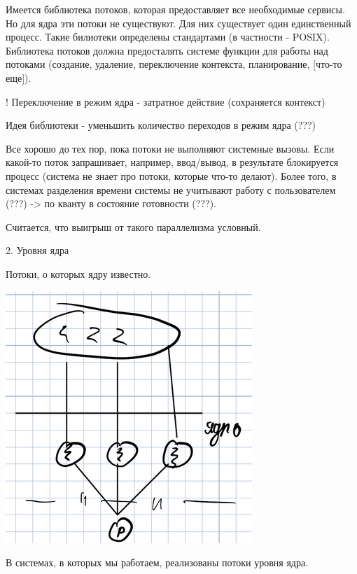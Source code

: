 \documentclass[a4paper, 12pt]{report}
\begin{document}
	Имеется библиотека потоков, которая предоставляет все необходимые сервисы. Но для ядра эти потоки не существуют. Для них существует один единственный процесс. Такие билиотеки определены стандартами (в частности - POSIX). Библиотека потоков должна предосталять системе функции для работы над потоками (создание, удаление, переключение контекста, планирование, [что-то еще]).
	
	! Переключение в режим ядра - затратное действие (сохраняется контекст)
	
	Идея библиотеки - уменьшить количество переходов в режим ядра (???)
	
	Все хорошо до тех пор, пока потоки не выполняют системные вызовы. Если какой-то поток запрашивает, например, ввод/вывод, в результате блокируется процесс (система не знает про потоки, которые что-то делают). Более того, в системах разделения времени системы не учитывают работу с пользователем (???) -> по кванту в состояние готовности (???).
	
	Считается, что выигрыш от такого параллелизма условный.
	
	2. Уровня ядра
	
	Потоки, о которых ядру известно.
	
	\includegraphics[width=\linewidth]{6}
	
	В системах, в которых мы работаем, реализованы потоки уровня ядра.
	
\end{document}
